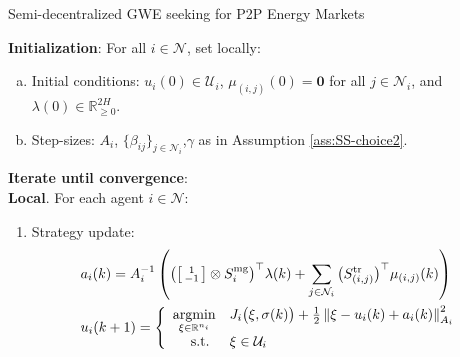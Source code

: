 \documentclass[10pt]{article}
\newcommand{\mc}{\mathcal}
\newcommand{\bb}{\mathbb}
\newcommand{\R}{\bb R}
\newcommand{\argmin}{\operatorname{argmin}}
\newcommand{\0}{\mathbf{0}}
\newcommand{\1}{\mathbf{1}}
\begin{document}
\begin{algorithm}[H]

	\caption{Semi-decentralized GWE seeking for P2P Energy Markets}
	
	\medskip
	\noindent
	\textbf{Initialization}:
	For all $ i \in \mc N$, set locally:
	\begin{enumerate}[(a)]
		\item Initial conditions: $u_i(0) \in \mc U_i$, $\mu_{(i,j)}(0) = \0$ for all $ j \in \mc N_i$, and $\lambda(0) \in \R^{2H}_{\geq 0}$.
		
		\item Step-sizes:
$A_i$, $\{\beta_{ij}\}_{j \in \mc N_i}$,$\gamma$ as in Assumption \ref{ass:SS-choice2}.

	\end{enumerate}
	
	
	\medskip
	\noindent
	\textbf{Iterate until convergence}:\\[1em]
\textbf{Local}. For each agent $i \in \mc N$:

\begin{enumerate}[(1)]
\item Strategy update:
	\begin{align*} 
	\textstyle
&	a_i(k) = 
	A_i^{-1} \left(
	{\left( \left[
	\begin{smallmatrix}
	 1 \\
	- 1
	\end{smallmatrix} 
	\right] \otimes S^{\textrm{mg}}_i \right)}^\top
	{\lambda(k)}
	+ 
	\sum_{j \in \mc N_i}  {\big(S^{\textrm{tr}}_{(i,j)}\big)}^\top {\mu_{(i,j)}(k)} \right) \\
	\textstyle
&	u_i(k+1) =
\left\{
\begin{array}{r l}
	\underset{\xi \in \R^{n_i}}{\argmin} & 
	J_{i} \big( \xi, \sigma(k) \big) 
	+ \frac{1}{2}
	\left\| \xi - u_i(k) + a_i(k) 
	\textstyle
	  \right\|^2_{A_i} \\
	  \text{s.t. } & \xi \in \mc U_i
\end{array} 
	\right.
	\end{align*}


\end{enumerate}
\end{algorithm}
\end{document}
